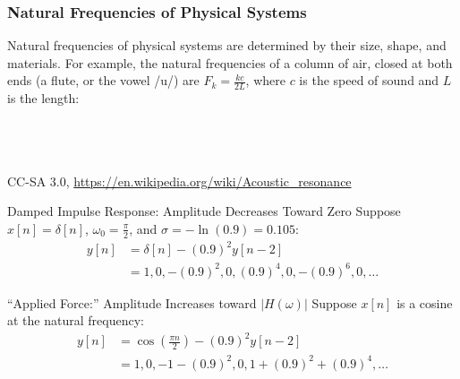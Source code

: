 \documentclass{beamer}
\begin{document}
\begin{frame}
  \frametitle{Natural Frequencies of Physical Systems}

  Natural frequencies of physical systems are determined by their
  size, shape, and materials.  For example, the natural frequencies of
  a column of air, closed at both ends (a flute, or the vowel /u/) are
  $F_k=\frac{kc}{2L}$, where $c$ is the speed of sound and $L$ is the
  length:

  \begin{center}
    \\
    \\
    \\
                    {\tiny CC-SA 3.0, \url{https://en.wikipedia.org/wiki/Acoustic_resonance}}
  \end{center}
\end{frame}

\begin{frame}
  \begin{block}{Damped Impulse Response: Amplitude Decreases Toward Zero}
    Suppose $x[n]=\delta[n]$, $\omega_0=\frac{\pi}{2}$, and
    $\sigma=-\ln(0.9)=0.105$:
    \begin{align*}
      y[n] 
      &= \delta[n] - (0.9)^2y[n-2]\\
      &= 1, 0, -(0.9)^2, 0, (0.9)^4, 0, -(0.9)^6, 0, \ldots
    \end{align*}
  \end{block}
  \begin{block}{``Applied Force:'' Amplitude Increases toward $|H(\omega)|$}
    Suppose $x[n]$ is a cosine at the natural frequency:
    \begin{align*}
      y[n] &= \cos\left(\frac{\pi n}{2}\right) - (0.9)^2 y[n-2]\\
      &= 1, 0, -1-(0.9)^2, 0, 1+(0.9)^2+(0.9)^4, \ldots
    \end{align*}
  \end{block}
\end{frame}

\end{document}
